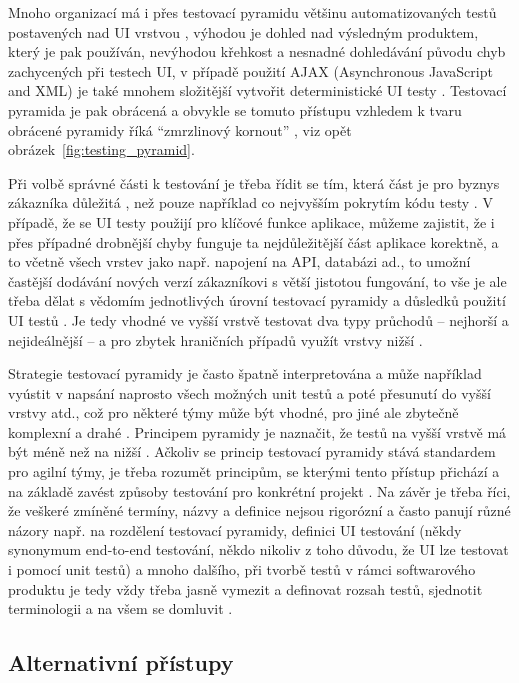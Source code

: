 Mnoho organizací má i přes testovací pyramidu většinu automatizovaných testů postavených nad UI vrstvou \cite{test-devqa}, výhodou je dohled nad výsledným produktem, který je pak používán, nevýhodou křehkost a nesnadné dohledávání původu chyb zachycených při testech UI, v případě použití AJAX (Asynchronous JavaScript and XML) je také mnohem složitější vytvořit deterministické UI testy \cite{test-timothy}. Testovací pyramida je pak obrácená a obvykle se tomuto přístupu vzhledem k tvaru obrácené pyramidy říká \enquote{zmrzlinový kornout} \cite{test-mf1}, viz opět obrázek~\ref{fig:testing_pyramid}. 

Při volbě správné části k testování je třeba řídit se tím, která část je pro byznys zákazníka důležitá \cite{test-kitner}, než pouze například co nejvyšším pokrytím kódu testy \cite{test-devqa}. V případě, že se UI testy použijí pro klíčové funkce aplikace, můžeme zajistit, že i přes případné drobnější chyby funguje ta nejdůležitější část aplikace korektně, a to včetně všech vrstev jako např. napojení na API, databázi ad., to umožní častější dodávání nových verzí zákazníkovi s větší jistotou fungování, to vše je ale třeba dělat s vědomím jednotlivých úrovní testovací pyramidy a důsledků použití UI testů \cite{test-novanet}. Je tedy vhodné ve vyšší vrstvě testovat dva typy průchodů -- nejhorší a nejideálnější -- a pro zbytek hraničních případů využít vrstvy nižší \cite{test-dzone}.

Strategie testovací pyramidy je často špatně interpretována a může například vyústit v napsání naprosto všech možných unit testů a poté přesunutí do vyšší vrstvy atd., což pro některé týmy může být vhodné, pro jiné ale zbytečně komplexní a drahé \cite{test-cucumber2}. Principem pyramidy je naznačit, že testů na vyšší vrstvě má být méně než na nižší \cite{test-cucumber2}. Ačkoliv se princip testovací pyramidy stává standardem pro agilní týmy, je třeba rozumět principům, se kterými tento přístup přichází a na základě zavést způsoby testování pro konkrétní projekt \cite{test-cucumber2}. Na závěr je třeba říci, že veškeré zmíněné termíny, názvy a definice nejsou rigorózní a často panují různé názory např. na rozdělení testovací pyramidy, definici UI testování (někdy synonymum end-to-end testování, někdo nikoliv z toho důvodu, že UI lze testovat i pomocí unit testů) a mnoho dalšího, při tvorbě testů v rámci softwarového produktu je tedy vždy třeba jasně vymezit a definovat rozsah testů, sjednotit terminologii a na všem se domluvit \cite{test-fowler}.

\subsection{Alternativní přístupy}

